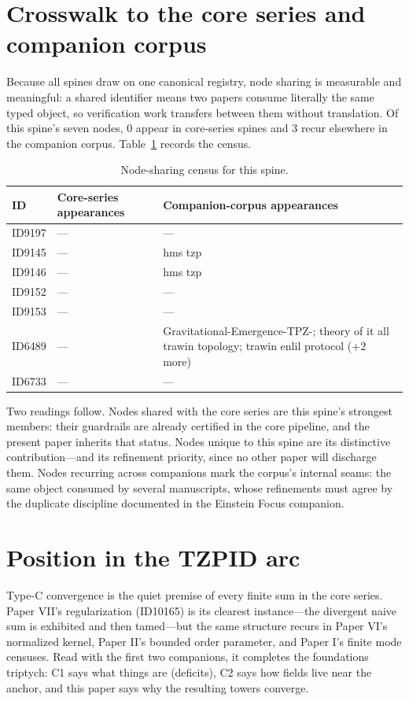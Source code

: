 \documentclass[11pt]{article}
\theoremstyle{remark}
\begin{document}
\section{Crosswalk to the core series and companion corpus}
\label{sec:crosswalk}

Because all spines draw on one canonical registry, node sharing is measurable and meaningful: a shared identifier means two papers consume literally the same typed object, so verification work transfers between them without translation. Of this spine's seven nodes, 0 appear in core-series spines and 3 recur elsewhere in the companion corpus. Table~\ref{tab:crosswalk} records the census.

\begin{table}[ht]
\centering
\small
\caption{Node-sharing census for this spine.}
\label{tab:crosswalk}
\begin{tabular}{lp{4.4cm}p{6.6cm}}
\toprule
ID & Core-series appearances & Companion-corpus appearances \\
\midrule
ID9197 & --- & --- \\
ID9145 & --- & hms tzp \\
ID9146 & --- & hms tzp \\
ID9152 & --- & --- \\
ID9153 & --- & --- \\
ID6489 & --- & Gravitational-Emergence-TPZ-; theory of it all trawin topology; trawin enlil protocol (+2 more) \\
ID6733 & --- & --- \\
\bottomrule
\end{tabular}
\end{table}

Two readings follow. Nodes shared with the core series are this spine's strongest members: their guardrails are already certified in the core pipeline, and the present paper inherits that status. Nodes unique to this spine are its distinctive contribution---and its refinement priority, since no other paper will discharge them. Nodes recurring across companions mark the corpus's internal seams: the same object consumed by several manuscripts, whose refinements must agree by the duplicate discipline documented in the Einstein Focus companion.

\section{Position in the TZPID arc}
\label{sec:arc}

Type-C convergence is the quiet premise of every finite sum in the core series. Paper VII's regularization (ID10165) is its clearest instance---the divergent naive sum is exhibited and then tamed---but the same structure recurs in Paper VI's normalized kernel, Paper II's bounded order parameter, and Paper I's finite mode censuses. Read with the first two companions, it completes the foundations triptych: C1 says what things are (deficits), C2 says how fields live near the anchor, and this paper says why the resulting towers converge.
\end{document}
